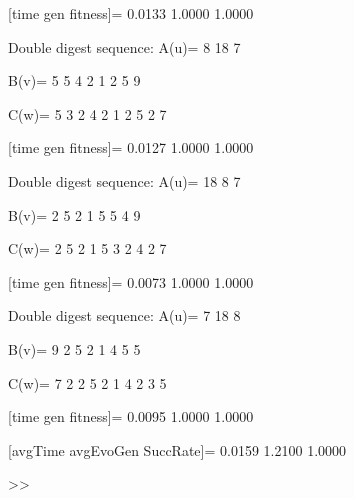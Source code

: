 [time gen fitness]=
    0.0133    1.0000    1.0000

Double digest sequence:
A(u)=
     8    18     7

B(v)=
     5     5     4     2     1     2     5     9

C(w)=
     5     3     2     4     2     1     2     5     2     7

[time gen fitness]=
    0.0127    1.0000    1.0000

Double digest sequence:
A(u)=
    18     8     7

B(v)=
     2     5     2     1     5     5     4     9

C(w)=
     2     5     2     1     5     3     2     4     2     7

[time gen fitness]=
    0.0073    1.0000    1.0000

Double digest sequence:
A(u)=
     7    18     8

B(v)=
     9     2     5     2     1     4     5     5

C(w)=
     7     2     2     5     2     1     4     2     3     5

[time gen fitness]=
    0.0095    1.0000    1.0000

[avgTime  avgEvoGen  SuccRate]=
    0.0159    1.2100    1.0000

>> 